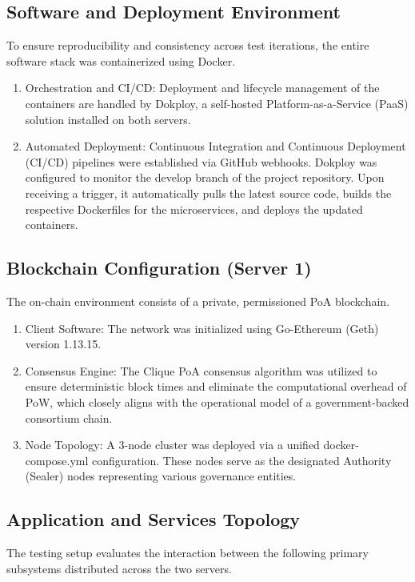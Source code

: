 \subsection{Software and Deployment Environment}
To ensure reproducibility and consistency across test iterations, the entire software stack was containerized using Docker. 
\begin{enumerate}
    \item Orchestration and CI/CD: Deployment and lifecycle management of the containers are handled by Dokploy, a self-hosted Platform-as-a-Service (PaaS) solution installed on both servers. 
    \item Automated Deployment: Continuous Integration and Continuous Deployment (CI/CD) pipelines were established via GitHub webhooks. Dokploy was configured to monitor the develop branch of the project repository. Upon receiving a trigger, it automatically pulls the latest source code, builds the respective Dockerfiles for the microservices, and deploys the updated containers.
\end{enumerate}

\subsection{Blockchain Configuration (Server 1)}
The on-chain environment consists of a private, permissioned \ac{PoA} blockchain.
\begin{enumerate}
    \item Client Software: The network was initialized using Go-Ethereum (Geth) version 1.13.15.
    \item Consensus Engine: The Clique \ac{PoA} consensus algorithm was utilized to ensure deterministic block times and eliminate the computational overhead of \ac{PoW}, which closely aligns with the operational model of a government-backed consortium chain.
    \item Node Topology: A 3-node cluster was deployed via a unified docker-compose.yml configuration. These nodes serve as the designated Authority (Sealer) nodes representing various governance entities.
\end{enumerate}

\subsection{Application and Services Topology}
The testing setup evaluates the interaction between the following primary subsystems distributed across the two servers.\\


